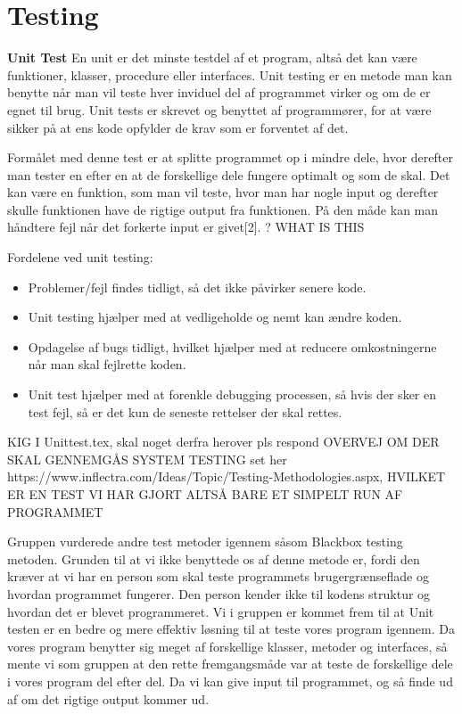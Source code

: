 \section{Testing}\label{Testing}

\textbf{Unit Test} \newline
En unit er det minste testdel af et program, altså det kan være funktioner, klasser, procedure eller interfaces. Unit testing er en metode man kan benytte når man vil teste hver inviduel del af programmet virker og om de er egnet til brug. Unit tests er skrevet og benyttet af programmører, for at være sikker på at ens kode opfylder de krav som er forventet af det. 

\vspace {5mm}

Formålet med denne test er at splitte programmet op i mindre dele, hvor derefter man tester en efter en at de forskellige dele fungere optimalt og som de skal. Det kan være en funktion, som man vil teste, hvor man har nogle input og derefter skulle funktionen have de rigtige output fra funktionen. På den måde kan man håndtere fejl når det forkerte input er givet[2]. ? WHAT IS THIS

Fordelene ved unit testing:
\begin{itemize}
\item Problemer/fejl findes tidligt, så det ikke påvirker senere kode.
\item Unit testing hjælper med at vedligeholde og nemt kan ændre koden.
\item Opdagelse af bugs tidligt, hvilket hjælper med at reducere omkostningerne når man skal fejlrette koden.
\item Unit test hjælper med at forenkle debugging processen, så hvis der sker en test fejl, så er det kun de seneste rettelser der skal rettes.
\end{itemize}\cite{unittestbenefits}

{\Large KIG I Unittest.tex, skal noget derfra herover pls respond}
{\Large OVERVEJ OM DER SKAL GENNEMGÅS SYSTEM TESTING set her https://www.inflectra.com/Ideas/Topic/Testing-Methodologies.aspx, HVILKET ER EN TEST VI HAR GJORT ALTSÅ BARE ET SIMPELT RUN AF PROGRAMMET}


Gruppen vurderede andre test metoder igennem såsom Blackbox testing metoden. Grunden til at vi ikke benyttede os af denne metode er, fordi den kræver at vi har en person som skal teste programmets brugergrænseflade og hvordan programmet fungerer. Den person kender ikke til kodens struktur og hvordan det er blevet programmeret. Vi i gruppen er kommet frem til at Unit testen er en bedre og mere effektiv løsning til at teste vores program igennem. Da vores program benytter sig meget af forskellige klasser, metoder og interfaces, så mente vi som gruppen at den rette fremgangsmåde var at teste de forskellige dele i vores program del efter del. Da vi kan give input til programmet, og så finde ud af om det rigtige output kommer ud.



